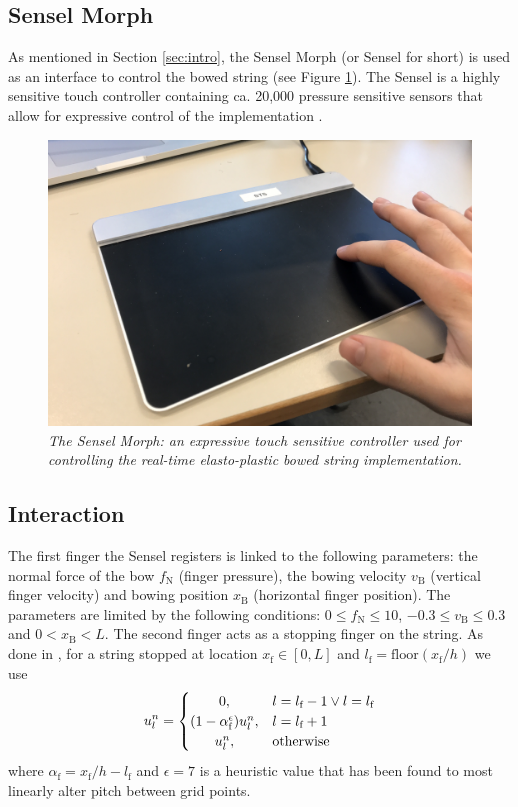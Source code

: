 \documentclass[twoside,a4paper,dvipsnames]{article}
\begin{document}
\subsection{Sensel Morph}
As mentioned in Section \ref{sec:intro}, the Sensel Morph (or Sensel for short) is used as an interface to control the bowed string (see Figure \ref{fig:sensel}). The Sensel is a highly sensitive touch controller containing ca. 20,000 pressure sensitive sensors that allow for expressive control of the implementation \cite{Sensel2019}.
\begin{figure}[ht]
\centerline{\includegraphics[width=1.0\columnwidth]{IMG_0637.jpg}}
\caption{\label{fig:sensel}{\it The Sensel Morph: an expressive touch sensitive controller used for controlling the real-time elasto-plastic bowed string implementation.}}
\end{figure}

\subsection{Interaction}
The first finger the Sensel registers is linked to the following parameters: the normal force of the bow $f_\text{N}$ (finger pressure), the bowing velocity $v_\text{B}$ (vertical finger velocity) and bowing position $x_\text{B}$ (horizontal finger position). The parameters are limited by the following conditions: $0 \leq f_\text{N} \leq 10$, $-0.3 \leq v_\text{B} \leq 0.3$ and $0<x_\text{B}<L$. The second finger acts as a stopping finger on the string. As done in \cite{Willemsen2019}, for a string stopped at location $x_\text{f}\in[0,L]$ and $l_\text{f}=\text{floor}(x_\text{f}/h)$ we use
\begin{equation}
u_l^n = 
    \begin{cases}
        \hfil 0, & l = l_\text{f} - 1 \vee l = l_\text{f}\\
        \hfil (1-\alpha_\text{f}^\epsilon) u_l^n, & l = l_\text{f} + 1\\
        \hfil u_l^n, & \text{otherwise}
    \end{cases}
\end{equation}
where $\alpha_\text{f} = x_\text{f} / h - l_\text{f}$ and $\epsilon = 7$ is a heuristic value that has been found to most linearly alter pitch between grid points. 
\end{document}
